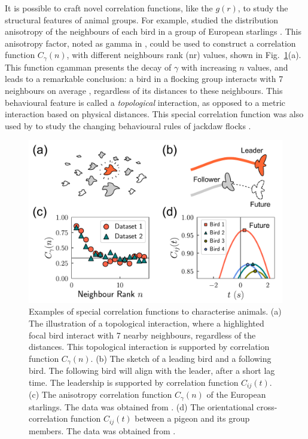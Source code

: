\documentclass[11pt,twoside]{report}
\begin{document}
It is possible to craft novel correlation functions, like the $g(r)$, to study the structural features of animal groups. For example, \citeauthor{ballerini2008pnas} studied the distribution anisotropy of the neighbours of each bird in a group of European starlings \cite{ballerini2008pnas}. This anisotropy factor, noted as \gls{gamma} in \cite{ballerini2008pnas}, could be used to construct a correlation function $C_\gamma(n)$, with different neighbours rank  (\gls{nr}) values, shown in Fig.~\ref{fig:corr-animal}(a). This function \gls{cgamman} presents the decay of $\gamma$ with increasing $n$ values, and leads to a remarkable conclusion: a bird in a flocking group interacts with 7 neighbours on average \cite{ballerini2008pnas, cavagna2014}, regardless of its distances to these neighbours.
This behavioural feature is called a \emph{topological} interaction, as opposed to a metric interaction based on physical distances. This special correlation function was also used by \citeauthor{ling2019nc} to study the changing behavioural rules of jackdaw flocks \cite{ling2019nc}.


\begin{figure}
  \includegraphics[width=\linewidth]{corr-animal}
  \caption[Examples of special correlation functions to characterise animals]{
Examples of special correlation functions to characterise animals.
  (a) The illustration of a topological interaction, where a highlighted focal bird interact with 7 nearby neighbours, regardless of the distances. This topological interaction is supported by correlation function $C_\gamma(n)$.
  (b) The sketch of a leading bird and a following bird. The following bird will align with the leader, after a short lag time. The leadership is supported by correlation function $C_{ij}(t)$.
  (c) The anisotropy correlation function $C_\gamma(n)$ of the European starlings. The data was obtained from \cite{ballerini2008pnas}.
  (d) The orientational cross-correlation function $C_{ij}(t)$ between a pigeon and its group members. The data was obtained from \cite{nagy2010}.
  }
  \label{fig:corr-animal}
\end{figure}
\end{document}
